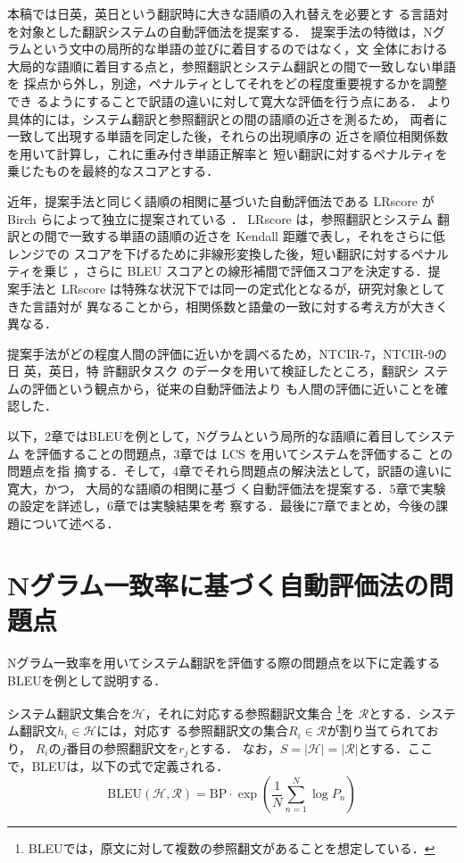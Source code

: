 \documentclass[japanese]{jnlp_1.4}
\begin{document}
本稿では日英，英日という翻訳時に大きな語順の入れ替えを必要とす
る言語対を対象とした翻訳システムの自動評価法を提案する．
提案手法の特徴は，Nグラムという文中の局所的な単語の並びに着目するのではなく，文
全体における
大局的な語順に着目する点と，参照翻訳とシステム翻訳との間で一致しない単語を
採点から外し，別途，ペナルティとしてそれをどの程度重要視するかを調整でき
るようにすることで訳語の違いに対して寛大な評価を行う点にある．
より具体的には，システム翻訳と参照翻訳との間の語順の近さを測るため，
両者に一致して出現する単語を同定した後，それらの出現順序の
近さを順位相関係数を用いて計算し，これに重み付き単語正解率と
短い翻訳に対するペナルティを乗じたものを最終的なスコアとする．

近年，提案手法と同じく語順の相関に基づいた自動評価法である LRscore が
Birch らによって独立に提案されている \cite{birch-acl}．
LRscore は，参照翻訳とシステム
翻訳との間で一致する単語の語順の近さを Kendall 距離で表し，それをさらに低レンジでの
スコアを下げるために非線形変換した後，短い翻訳に対するペナルティを乗じ
，さらに BLEU スコアとの線形補間で評価スコアを決定する．提
案手法と LRscore は特殊な状況下では同一の定式化となるが，研究対象としてきた言語対が
異なることから，相関係数と語彙の一致に対する考え方が大きく異なる．

提案手法がどの程度人間の評価に近いかを調べるため，NTCIR-7，NTCIR-9の日
英，英日，特
許翻訳タスク \cite{ntcir7,ntcir9}のデータを用いて検証したところ，翻訳シ
ステムの評価という観点から，従来の自動評価法より
も人間の評価に近いことを確認した．

以下，2章ではBLEUを例として，Nグラムという局所的な語順に着目してシステム
を評価することの問題点，3章では LCS を用いてシステムを評価するこ
との問題点を指
摘する．そして，4章でそれら問題点の解決法として，訳語の違いに寛大，かつ，
大局的な語順の相関に基づ
く自動評価法を提案する．5章で実験の設定を詳述し，6章では実験結果を考
察する．最後に7章でまとめ，今後の課題について述べる．


\section{Nグラム一致率に基づく自動評価法の問題点}

Nグラム一致率を用いてシステム翻訳を評価する際の問題点を以下に定義する
BLEUを例として説明する．

システム翻訳文集合を${\mathcal H}$，それに対応する参照翻訳文集合
\footnote{
BLEUでは，原文に対して複数の参照翻文があることを想定している．}を
${\mathcal R}$とする．システム翻訳文$h_i \in \mathcal H$には，対応す
る参照翻訳文の集合$R_i \in \mathcal R$が割り当てられており，
$R_i$の$j$番目の参照翻訳文を$r_j$とする．
なお，$S=|\mathcal H|=|\mathcal R|$とする．ここで，BLEUは，以下の式で定義される．
\begin{equation}
 \text{BLEU}(\mathcal{H},\mathcal{R})=\text{BP}\cdot\exp\left(\frac{1}{N}\sum_{n=1}^N \log P_n\right)
\end{equation}
\end{document}

